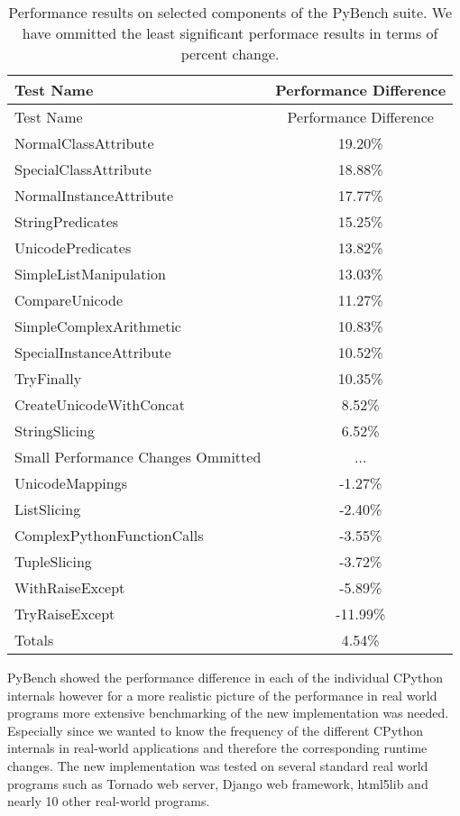 \documentclass[11pt]{article}
\begin{document}
\begin{table}
  \caption{Performance results on selected components of the PyBench suite.  We
    have ommitted the least significant performace results in terms of percent
    change.
  }
\begin{tabular}{| l | c |}
  \hline
  \textbf{Test Name} & \textbf{Performance Difference} \\ \hline
  Test Name & Performance Difference \\ \hline
  NormalClassAttribute &  19.20\% \\ \hline
  SpecialClassAttribute &  18.88\% \\ \hline
  NormalInstanceAttribute &  17.77\% \\ \hline
  StringPredicates &  15.25\% \\ \hline
  UnicodePredicates &  13.82\% \\ \hline
  SimpleListManipulation &  13.03\% \\ \hline
  CompareUnicode &  11.27\% \\ \hline
  SimpleComplexArithmetic &  10.83\% \\ \hline
  SpecialInstanceAttribute &  10.52\% \\ \hline
  TryFinally &  10.35\% \\ \hline
  CreateUnicodeWithConcat &  8.52\% \\ \hline
  StringSlicing &  6.52\% \\ \hline
  Small Performance Changes Ommitted & ... \\ \hline
  UnicodeMappings &  -1.27\% \\ \hline
  ListSlicing &  -2.40\% \\ \hline
  ComplexPythonFunctionCalls &  -3.55\% \\ \hline
  TupleSlicing &  -3.72\% \\ \hline
  WithRaiseExcept &  -5.89\% \\ \hline
  TryRaiseExcept &  -11.99\% \\ \hline
  Totals & 4.54\% \\ \hline
\end{tabular}
\end{table}

PyBench showed the performance difference in each of the individual CPython internals however for a more realistic picture of the performance in real world programs more extensive benchmarking of the new implementation was needed. Especially since we wanted to know the frequency of the different CPython internals in real-world applications and therefore the corresponding runtime changes. The new implementation was tested on several standard real world programs such as Tornado web server, Django web framework, html5lib and nearly 10 other real-world programs. 
\end{document}
